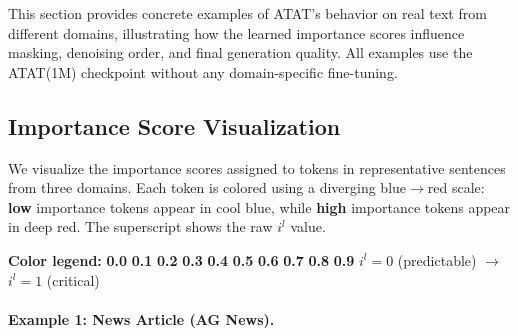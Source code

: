 This section provides concrete examples of ATAT's behavior on real text from different domains, illustrating how the learned importance scores influence masking, denoising order, and final generation quality. All examples use the ATAT(1M) checkpoint without any domain-specific fine-tuning.

\newcommand{\itok}[3]{{\textcolor{#1}{\textsf{\textbf{#2}}}}\textsuperscript{\tiny #3}}

\subsection{Importance Score Visualization}

We visualize the importance scores assigned to tokens in representative sentences from three domains. Each token is colored using a diverging blue$\to$red scale: {\textcolor{imp0}{\textsf{\textbf{low}}}} importance tokens appear in cool blue, while {\textcolor{imp9}{\textsf{\textbf{high}}}} importance tokens appear in deep red. The superscript shows the raw $i^l$ value.

\vspace{4pt}
\noindent\textbf{Color legend:}\quad
{\textcolor{imp0}{\textsf{\textbf{0.0}}}}\;%
{\textcolor{imp1}{\textsf{\textbf{0.1}}}}\;%
{\textcolor{imp2}{\textsf{\textbf{0.2}}}}\;%
{\textcolor{imp3}{\textsf{\textbf{0.3}}}}\;%
{\textcolor{imp4}{\textsf{\textbf{0.4}}}}\;%
{\textcolor{imp5}{\textsf{\textbf{0.5}}}}\;%
{\textcolor{imp6}{\textsf{\textbf{0.6}}}}\;%
{\textcolor{imp7}{\textsf{\textbf{0.7}}}}\;%
{\textcolor{imp8}{\textsf{\textbf{0.8}}}}\;%
{\textcolor{imp9}{\textsf{\textbf{0.9}}}}%
\hfill{\scriptsize $i^l = 0$ (predictable) $\longrightarrow$ $i^l = 1$ (critical)}
\vspace{6pt}

\paragraph{Example 1: News Article (AG News).}

